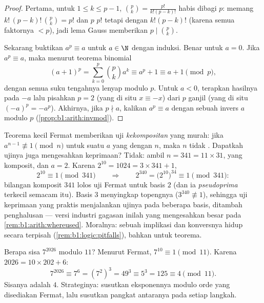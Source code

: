 \begin{proof}
Pertama, untuk $1 \leq k \leq p - 1$,  $\binom pk
= \frac{p!}{k!(p-k)!}$ habis dibagi $p$: memang $k!\,(p-k)!\,
\binom pk = p!$ dan $p$  $p!$ tetapi  dengan $k!(p-k)!$
(karena semua faktornya $< p$), jadi lema Gauss memberikan $p \mid \binom pk$.

Sekarang buktikan $a^p \equiv a$ untuk $a \in \N$ dengan induksi. Benar untuk $a =
0$. Jika $a^p \equiv a$, maka menurut teorema binomial
\[
(a+1)^p = \sum_{k=0}^{p} \binom pk a^k
\equiv a^p + 1 \equiv a + 1 \pmod p,
\]
dengan semua suku tengahnya lenyap modulo $p$. Untuk $a < 0$, terapkan hasilnya pada
$-a$ lalu pisahkan $p = 2$ (yang di situ $x \equiv -x$) dari $p$ ganjil (yang di situ
$(-a)^p = -a^p$). Akhirnya, jika $p \nmid a$, kalikan $a^p \equiv a$ dengan
sebuah invers $a$ modulo $p$ (\cref{prop:b1:arith:invmod}).
\end{proof}

\begin{example}\label{ex:b1:arith:pseudoprime}
Teorema kecil Fermat memberikan uji \emph{kekompositan} yang murah:
jika $a^{n-1} \not\equiv 1 \pmod n$ untuk suatu $a$ yang  dengan $n$,
maka $n$ tidak . Dapatkah ujinya juga mengesahkan keprimaan? Tidak:
ambil $n = 341 = 11 \times 31$, yang komposit, dan $a = 2$. Karena
$2^{10} = 1024 = 3 \times 341 + 1$,
\[
2^{10} \equiv 1 \pmod{341}
\qquad\Longrightarrow\qquad
2^{340} = \bigl(2^{10}\bigr)^{34} \equiv 1 \pmod{341} :
\]
bilangan komposit $341$ lolos uji Fermat untuk basis $2$ (dan ia
\emph{pseudoprima} terkecil semacam itu). Basis $3$ menyingkap topengnya
($3^{340} \not\equiv 1$), sehingga uji keprimaan yang praktis
menjalankan ujinya pada beberapa basis, ditambah penghalusan ---
versi industri gagasan inilah yang mengesahkan 
besar pada \cref{rem:b1:arith:whereused}. Moralnya: sebuah implikasi
dan konversnya hidup secara terpisah
(\cref{rem:b1:logic:pitfalls}), bahkan untuk teorema.
\end{example}

\begin{example}\label{ex:b1:arith:congruences}
Berapa sisa $7^{2026}$ modulo $11$? Menurut Fermat, $7^{10}
\equiv 1 \pmod{11}$. Karena $2026 = 10 \times 202 + 6$:
\[
7^{2026} \equiv 7^6 = (7^2)^3 = 49^3 \equiv 5^3 = 125 \equiv 4
\pmod{11}.
\]
Sisanya adalah $4$. Strateginya: susutkan eksponennya modulo
orde yang disediakan Fermat, lalu susutkan pangkat antaranya pada setiap
langkah.
\end{example}

